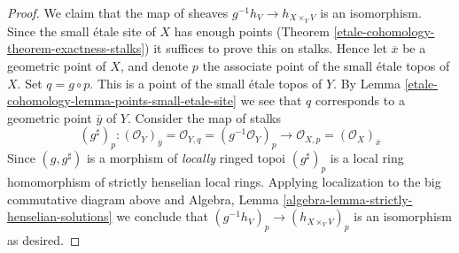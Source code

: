 \begin{proof}
\medskip\noindent
We claim that the map of sheaves $g^{-1}h_V \to h_{X \times_Y V}$
is an isomorphism. Since the small \'etale site of $X$ has enough points
(Theorem \ref{etale-cohomology-theorem-exactness-stalks})
it suffices to prove this on stalks. Hence let $\overline{x}$ be a
geometric point of $X$, and denote $p$ the associate point of the
small \'etale topos of $X$. Set $q = g \circ p$. This is a point of
the small \'etale topos of $Y$. By
Lemma \ref{etale-cohomology-lemma-points-small-etale-site}
we see that $q$ corresponds to a geometric point $\overline{y}$ of
$Y$. Consider the map of stalks
$$
(g^\sharp)_p :
(\mathcal{O}_Y)_{\overline{y}} =
\mathcal{O}_{Y, q} =
(g^{-1}\mathcal{O}_Y)_p
\longrightarrow
\mathcal{O}_{X, p} =
(\mathcal{O}_X)_{\overline{x}}
$$
Since $(g, g^\sharp)$ is a morphism of {\it locally} ringed topoi
$(g^\sharp)_p$ is a local ring homomorphism of strictly henselian
local rings. Applying localization to the big commutative diagram above and
Algebra, Lemma \ref{algebra-lemma-strictly-henselian-solutions}
we conclude that $(g^{-1}h_V)_p \to (h_{X \times_Y V})_p$ is an isomorphism
as desired.


\end{proof}
